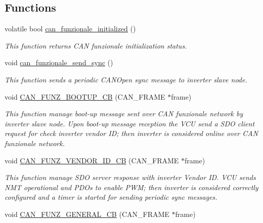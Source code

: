 \subsection*{Functions}
\begin{DoxyCompactItemize}
\item 
volatile bool \mbox{\hyperlink{group___c_a_n__funzionale__group_gaf1acdfa5537f47656edd6ffa3e7c24bd}{can\+\_\+funzionale\+\_\+initialized}} ()
\begin{DoxyCompactList}\small\item\em This function returns C\+AN funzionale initialization status. \end{DoxyCompactList}\item 
void \mbox{\hyperlink{group___c_a_n__funzionale__group_gac93bbbf1b84f1bc82b26d54d7f898172}{can\+\_\+funzionale\+\_\+send\+\_\+sync}} ()
\begin{DoxyCompactList}\small\item\em This function sends a periodic C\+A\+N\+Open sync message to inverter slave node. \end{DoxyCompactList}\item 
void \mbox{\hyperlink{group___c_a_n__funzionale__group_gaf4990e00c0c4a9f9eeb9cb5bdaecfa94}{C\+A\+N\+\_\+\+F\+U\+N\+Z\+\_\+\+B\+O\+O\+T\+U\+P\+\_\+\+CB}} (C\+A\+N\+\_\+\+F\+R\+A\+ME $\ast$frame)
\begin{DoxyCompactList}\small\item\em This function manage boot-\/up message sent over C\+AN funzionale network by inverter slave node. Upon boot-\/up message reception the V\+CU send a S\+DO client request for check inverter vendor ID; then inverter is considered online over C\+AN funzionale network. \end{DoxyCompactList}\item 
void \mbox{\hyperlink{group___c_a_n__funzionale__group_ga81bbc4c65d579febfbcae399f0ecbffc}{C\+A\+N\+\_\+\+F\+U\+N\+Z\+\_\+\+V\+E\+N\+D\+O\+R\+\_\+\+I\+D\+\_\+\+CB}} (C\+A\+N\+\_\+\+F\+R\+A\+ME $\ast$frame)
\begin{DoxyCompactList}\small\item\em This function manage S\+DO server response with inverter Vendor ID. V\+CU sends N\+MT operational and P\+D\+Os to enable P\+WM; then inverter is considered correctly configured and a timer is started for sending periodic sync messages. \end{DoxyCompactList}\item 
void \mbox{\hyperlink{group___c_a_n__funzionale__group_ga1fcfa8e31cfbfe2461328c345b5b8e19}{C\+A\+N\+\_\+\+F\+U\+N\+Z\+\_\+\+G\+E\+N\+E\+R\+A\+L\+\_\+\+CB}} (C\+A\+N\+\_\+\+F\+R\+A\+ME $\ast$frame)

\end{DoxyCompactItemize}

